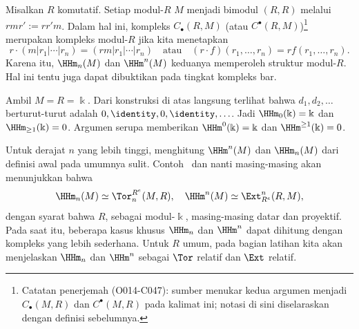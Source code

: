 \begin{catatan}
	Misalkan $R$ komutatif. Setiap modul-$R$ $M$ menjadi bimodul $(R,R)$
	melalui $rmr':=rr'm$. Dalam hal ini, kompleks $C_\bullet(R,M)$ (atau
	$C^\bullet(R,M)$)\footnote{Catatan penerjemah (O014-C047): sumber menukar kedua
	argumen menjadi $C_\bullet(M,R)$ dan $C^\bullet(M,R)$ pada kalimat ini;
	notasi di sini diselaraskan dengan definisi sebelumnya.}
	merupakan kompleks modul-$R$ jika kita menetapkan
	\[ r\cdot(m|r_1|\cdots|r_n)=(rm|r_1|\cdots|r_n)
		\quad\text{atau}\quad
		(r\cdot f)(r_1,\ldots,r_n)=rf(r_1,\ldots,r_n). \]
	Karena itu, $\HHm_n(M)$ dan $\HHm^n(M)$ keduanya memperoleh struktur
	modul-$R$. Hal ini tentu juga dapat dibuktikan pada tingkat kompleks bar.
\end{catatan}

\begin{contoh}
	Ambil $M=R=\Bbbk$. Dari konstruksi di atas langsung terlihat bahwa
	$d_1,d_2,\ldots$ berturut-turut adalah
	$0,\identity,0,\identity,\ldots$. Jadi
	$\HHm_0(\Bbbk)=\Bbbk$ dan $\HHm_{\geq1}(\Bbbk)=0$. Argumen serupa
	memberikan $\HHm^0(\Bbbk)=\Bbbk$ dan $\HHm^{\geq1}(\Bbbk)=0$.
\end{contoh}

Untuk derajat $n$ yang lebih tinggi, menghitung $\HHm^n(M)$ dan $\HHm_n(M)$
dari definisi awal pada umumnya sulit.
Contoh~ dan
 nanti masing-masing akan menunjukkan
bahwa
\[ \HHm_n(M) \simeq \Tor^{R^e}_n(M, R), \quad
	\HHm^n(M) \simeq \Ext_{R^e}^n(R, M), \]
dengan syarat bahwa $R$, sebagai modul-$\Bbbk$, masing-masing datar dan
proyektif. Pada saat itu, beberapa kasus khusus $\HHm_n$ dan $\HHm^n$ dapat
dihitung dengan kompleks yang lebih sederhana. Untuk $R$ umum, pada bagian
latihan  kita akan menjelaskan
$\HHm_n$ dan $\HHm^n$
sebagai $\Tor$ relatif dan $\Ext$ relatif.

